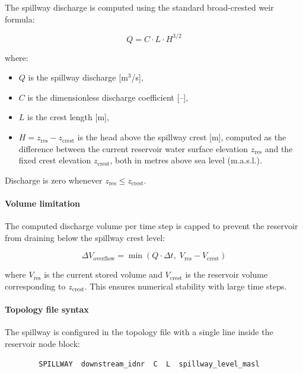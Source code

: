 \documentclass[a4paper, 12pt]{report}
\begin{document}
	The spillway discharge is computed using the standard broad-crested weir formula:

	\begin{equation}
		Q = C \cdot L \cdot H^{3/2}
		\label{eq:spillway}
	\end{equation}

	\noindent where:
	\begin{itemize}
		\item $Q$ \quad is the spillway discharge [m$^3$/s],
		\item $C$ \quad is the dimensionless discharge coefficient [--],
		\item $L$ \quad is the crest length [m],
		\item $H = z_\text{res} - z_\text{crest}$ \quad is the head above the spillway crest [m], computed as the difference between the current reservoir water surface elevation $z_\text{res}$ and the fixed crest elevation $z_\text{crest}$, both in metres above sea level (m.a.s.l.).
	\end{itemize}

	Discharge is zero whenever $z_\text{res} \leq z_\text{crest}$.

	\paragraph{Volume limitation}

	The computed discharge volume per time step is capped to prevent the reservoir from draining below the spillway crest level:

	\begin{equation}
		\Delta V_\text{overflow} = \min\!\left(Q \cdot \Delta t,\; V_\text{res} - V_\text{crest}\right)
	\end{equation}

	\noindent where $V_\text{res}$ is the current stored volume and $V_\text{crest}$ is the reservoir volume corresponding to $z_\text{crest}$. This ensures numerical stability with large time steps.

	\paragraph{Topology file syntax}

	The spillway is configured in the topology file with a single line inside the reservoir node block:

	\begin{verbatim}
		SPILLWAY  downstream_idnr  C  L  spillway_level_masl
	\end{verbatim}
\end{document}
